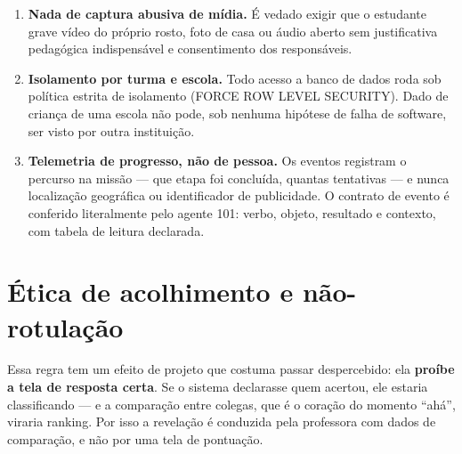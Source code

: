 \documentclass[11pt,a4paper]{article}
\newcommand{\cod}[1]{{\ttfamily\small #1}}
\begin{document}
\begin{enumerate}
  \item \textbf{Nada de captura abusiva de mídia.} É vedado exigir que o estudante grave vídeo do próprio rosto, foto de casa ou áudio aberto sem justificativa pedagógica indispensável e consentimento dos responsáveis.
  \item \textbf{Isolamento por turma e escola.} Todo acesso a banco de dados roda sob política estrita de isolamento (\cod{FORCE ROW LEVEL SECURITY}). Dado de criança de uma escola não pode, sob nenhuma hipótese de falha de software, ser visto por outra instituição.
  \item \textbf{Telemetria de progresso, não de pessoa.} Os eventos registram o percurso na missão --- que etapa foi concluída, quantas tentativas --- e nunca localização geográfica ou identificador de publicidade. O contrato de evento é conferido literalmente pelo agente 101: verbo, objeto, resultado e contexto, com tabela de leitura declarada.
\end{enumerate}

\section{Ética de acolhimento e não-rotulação}

\begin{center}
\end{center}

Essa regra tem um efeito de projeto que costuma passar despercebido: ela \textbf{proíbe a tela de resposta certa}. Se o sistema declarasse quem acertou, ele estaria classificando --- e a comparação entre colegas, que é o coração do momento ``ahá'', viraria ranking. Por isso a revelação é conduzida pela professora com dados de comparação, e não por uma tela de pontuação.
\end{document}
